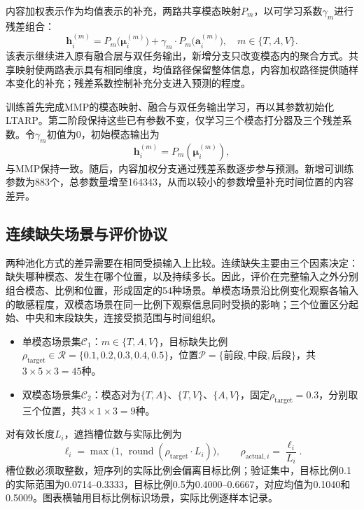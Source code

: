 \documentclass[UTF8,a4paper,11pt]{ctexart}
\newcommand{\QTwoParagraph}{\par\noindent\hspace*{2em}}
\newcounter{q2algorithm}
\begin{document}
\QTwoParagraph 内容加权表示作为均值表示的补充，两路共享模态映射$P_m$，以可学习系数$\gamma_m$进行残差组合：
\begin{equation}
\mathbf h_i^{(m)} = P_m\big(\boldsymbol\mu_i^{(m)}\big) + \gamma_m \cdot P_m\big(\mathbf a_i^{(m)}\big), \quad m \in \{T, A, V\}.
\label{eq:q2_residual_composite}
\end{equation}
该表示继续进入原有融合层与双任务输出，新增分支只改变模态内的聚合方式。共享映射使两路表示具有相同维度，均值路径保留整体信息，内容加权路径提供随样本变化的补充；残差系数控制补充分支进入预测的程度。

\QTwoParagraph 训练首先完成MMP的模态映射、融合与双任务输出学习，再以其参数初始化LTARP。第二阶段保持这些已有参数不变，仅学习三个模态打分器及三个残差系数。令$\gamma_m$初值为0，初始模态输出为
\begin{equation}
\mathbf h_i^{(m)} = P_m(\boldsymbol\mu_i^{(m)}),
\end{equation}
与MMP保持一致。随后，内容加权分支通过残差系数逐步参与预测。新增可训练参数为883个，总参数量增至164343，从而以较小的参数增量补充时间位置的内容差异。

\subsection{连续缺失场景与评价协议}\label{subsec:q2_benchmark}
\QTwoParagraph 两种池化方式的差异需要在相同受损输入上比较。连续缺失主要由三个因素决定：缺失哪种模态、发生在哪个位置，以及持续多长。因此，评价在完整输入之外分别组合模态、比例和位置，形成固定的54种场景。单模态场景沿比例变化观察各输入的敏感程度，双模态场景在同一比例下观察信息同时受损的影响；三个位置区分起始、中央和末段缺失，连接受损范围与时间组织。

\begin{itemize}[leftmargin=2.5em,itemsep=0pt,topsep=2pt]
\item 单模态场景集$\mathcal C_1$：$m\in\{T,A,V\}$，目标缺失比例$\rho_{\mathrm{target}}\in\mathcal R=\{0.1,0.2,0.3,0.4,0.5\}$，位置$\mathcal P=\{\text{前段},\text{中段},\text{后段}\}$，共$3\times5\times3=45$种。
\item 双模态场景集$\mathcal C_2$：模态对为$\{T,A\}$、$\{T,V\}$、$\{A,V\}$，固定$\rho_{\mathrm{target}}=0.3$，分别取三个位置，共$3\times1\times3=9$种。
\end{itemize}

\QTwoParagraph 对有效长度$L_i$，遮挡槽位数与实际比例为
\begin{equation}
\ell_i = \max\big(1,\, \operatorname{round}(\rho_{\mathrm{target}} \cdot L_i)\big),\qquad
\rho_{\mathrm{actual}, i} = \frac{\ell_i}{L_i}.
\label{eq:q2_mask_len}
\end{equation}
槽位数必须取整数，短序列的实际比例会偏离目标比例；验证集中，目标比例0.1的实际范围为0.0714--0.3333，目标比例0.5为0.4000--0.6667，对应均值为0.1040和0.5009。图表横轴用目标比例标识场景，实际比例逐样本记录。
\end{document}
